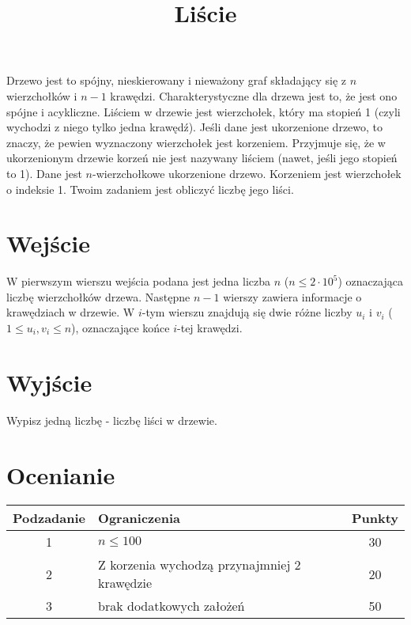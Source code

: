 \documentclass[zad,zawodnik,utf8]{sinol}
\title{Liście}
\begin{document}
\begin{tasktext}

    \noindent Drzewo jest to spójny, nieskierowany i nieważony graf
    składający się z $n$ wierzchołków i $n-1$ krawędzi.
    Charakterystyczne dla drzewa jest to, że jest ono spójne i acykliczne.
    Liściem w drzewie jest wierzchołek, który ma stopień 1
    (czyli wychodzi z niego tylko jedna krawędź).
    Jeśli dane jest ukorzenione drzewo, to znaczy,
    że pewien wyznaczony wierzchołek jest korzeniem.
    Przyjmuje się, że w ukorzenionym drzewie korzeń nie jest nazywany liściem
    (nawet, jeśli jego stopień to 1).
    Dane jest $n$-wierzchołkowe ukorzenione drzewo.
    Korzeniem jest wierzchołek o indeksie 1.  
    Twoim zadaniem jest obliczyć liczbę jego liści.

\section{Wejście}

    W pierwszym wierszu wejścia podana jest jedna liczba $n$ ($n \leq 2 \cdot 10^5$)
    oznaczająca liczbę wierzchołków drzewa.
    Następne $n-1$ wierszy zawiera informacje o krawędziach w drzewie.
    W $i$-tym wierszu znajdują się dwie różne liczby $u_i$ i $v_i$
    ($1 \leq u_i, v_i \leq n$), oznaczające końce $i$-tej krawędzi.

\section{Wyjście}

    Wypisz jedną liczbę - liczbę liści w drzewie.

\examplesection

\section{Ocenianie}

    \begin{center}
        \begin{tabular}{|c|p{5cm}|c|}
            \hline
            \textbf{Podzadanie} & \textbf{Ograniczenia} & \textbf{Punkty} \\
            \hline
            1 & $n \leq 100$ & 30 \\
            \hline
            2 & Z korzenia wychodzą przynajmniej 2 krawędzie & 20 \\
            \hline
            3 & brak dodatkowych założeń & 50 \\
            \hline
        \end{tabular}
    \end{center}

\end{tasktext}
\end{document}

